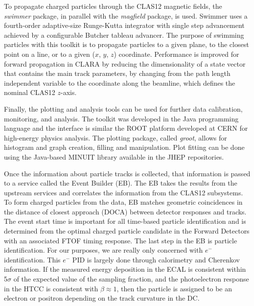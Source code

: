 To propagate charged particles through the CLAS12 magnetic fields, the \textit{swimmer} package, in parallel with the \textit{magfield} package, is used. Swimmer uses a fourth-order adaptive-size Runge-Kutta integrator with single step advancement achieved by a configurable Butcher tableau advancer. The purpose of swimming particles with this toolkit is to propagate particles to a given plane, to the closest point on a line, or to a given ($x$, $y$, $z$) coordinate. Performance is improved for forward propagation in CLARA by reducing the dimensionality of a state vector that contains the main track parameters, by changing from the path length independent variable to the coordinate along the beamline, which defines the nominal CLAS12 $z$-axis.

Finally, the plotting and analysis tools can be used for further data calibration, monitoring, and analysis. The toolkit was developed in the Java programming language and the interface is similar the ROOT platform developed at CERN for high-energy physics analysis. The plotting package, called \textit{groot}, allows for histogram and graph creation, filling and manipulation. Plot fitting can be done using the Java-based MINUIT library available in the JHEP repositories.

Once the information about particle tracks is collected, that information is passed to a service called the Event Builder (EB). The EB takes the results from the upstream services and correlates the information from the CLAS12 subsystems. To form charged particles from the data, EB matches geometric coincidences in the distance of closest approach (DOCA) between detector responses and tracks. The event start time is important for all time-based particle identification and is determined from the optimal charged particle candidate in the Forward Detectors with an associated FTOF timing response. The last step in the EB is particle identification. For our purposes, we are really only concerned with $e^-$ identification. This $e^-$ PID is largely done through calorimetry and Cherenkov information. If the measured energy deposition in the ECAL is consistent within 5$\sigma$ of the expected value of the sampling fraction, and the photoelectron response in the HTCC is consistent with $\beta \approx 1$, then the particle is assigned to be an electron or positron depending on the track curvature in the DC.   

